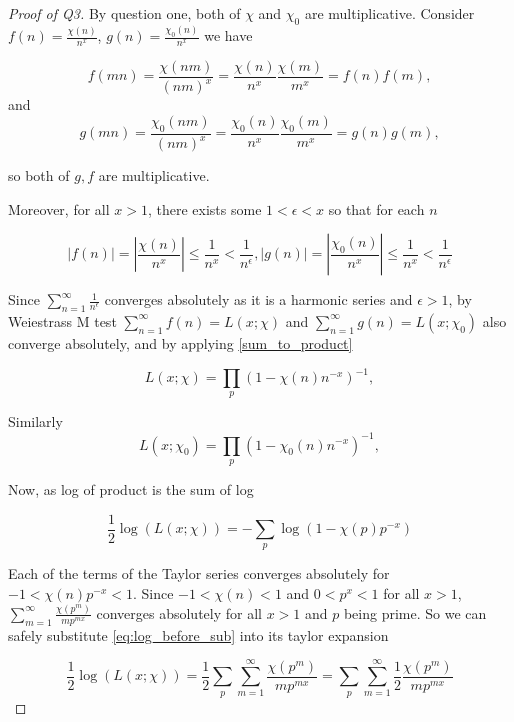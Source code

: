 \documentclass{article}
\theoremstyle{definition}
\theoremstyle{definition}
\theoremstyle{remark}
\begin{document}
\begin{proof}[Proof of Q3]
	By question one, both of $\chi$ and $\chi_0$ are multiplicative. 
	Consider $f(n) = \frac{\chi(n)}{n^x}$, $g(n) = \frac{\chi_0(n)}{n^x}$ we have 
	
	$$
		f(mn) = \frac{\chi(nm)}{(nm)^x} = \frac{\chi(n)}{n^x} \frac{\chi(m)}{m^x} = f(n)f(m),
	$$ 
	and
	$$
		g(mn) = \frac{\chi_0(nm)}{(nm)^x} = \frac{\chi_0(n)}{n^x} \frac{\chi_0(m)}{m^x} = g(n)g(m),
	$$

	so both of $g, f$ are multiplicative. 

	Moreover, for all $x > 1$, there exists some $ 1 < \epsilon < x$ so that for each $n$

	$$
	 |f(n)| = \left|\frac{\chi(n)}{n^x}\right| \leq \frac{1}{n^x} < \frac{1}{n^\epsilon} ,
	 |g(n)| = \left|\frac{\chi_0(n)}{n^x}\right| \leq \frac{1}{n^x} < \frac{1}{n^\epsilon} 
	$$

	Since $\sum_{n=1}^{\infty} \frac{1}{n^\epsilon}$ converges absolutely as it is a harmonic series and $\epsilon > 1$,
	by Weiestrass M test $\sum_{n=1}^{\infty} f(n) = L(x; \chi)$ and $\sum_{n=1}^{\infty} g(n) = L(x; \chi_0)$
	also converge absolutely, and
	by applying \ref{sum_to_product}

\begin{equation}
	L(x; \chi) = \prod_p (1-\chi(n)n^{-x})^{-1}, 
\end{equation}	

Similarly 
\begin{equation}
	L(x; \chi_0) = \prod_p (1-\chi_0(n)n^{-x})^{-1}, 
\end{equation}

Now, as log of product is the sum of log 

\begin{equation}\label{eq:log_before_sub}
	\frac{1}{2}\log(L(x; \chi)) = - \sum_{p} \log(1-\chi(p)p^{-x})
\end{equation}

Each of the terms of the Taylor series converges absolutely for $-1<\chi(n)p^{-x} < 1$.
Since $-1< \chi(n) < 1$ and $0 < p^x < 1$ for all $x > 1$, $\sum_{m=1}^{\infty} \frac{\chi(p^m)}{mp^{mx}}$  converges absolutely for all $x > 1$ and $p$ being prime.
So we can safely substitute \ref{eq:log_before_sub} into its taylor expansion

\begin{equation}\label{eq_log_subbed}
	\frac{1}{2}\log(L(x; \chi)) = 
	\frac{1}{2}\sum_{p} \sum_{m=1}^{\infty} \frac{\chi(p^m)}{mp^{mx}}=
	\sum_{p} \sum_{m=1}^{\infty} \frac{1}{2}\frac{\chi(p^m)}{mp^{mx}}
\end{equation}


\end{proof}
\end{document}

